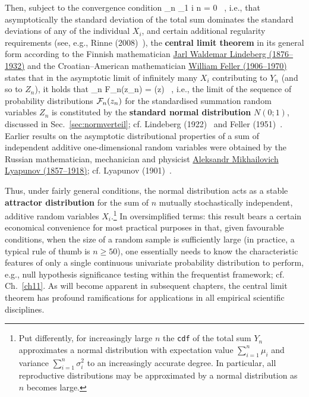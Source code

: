 \medskip
\noindent
Then, subject to the convergence condition
%
\be
\lim_{n \to \infty}\max_{1 \leq i \leq 
n} = 0 \ ,
\ee
%
i.e., that asymptotically the standard deviation of the total sum 
dominates the standard deviations of any of the individual $X_{i}$,
and certain additional regularity requirements (see, e.g., Rinne
(2008)~), the \textbf{central limit theorem}
in its general form according to the Finnish mathematician 
\href{http://en.wikipedia.org/wiki/Jarl_Waldemar_Lindeberg}{Jarl 
Waldemar Lindeberg (1876--1932)} and the Croatian--American 
mathematician 
\href{http://www-history.mcs.st-and.ac.uk/Biographies/Feller.html}{William Feller (1906--1970)} states that in the asymptotic limit 
of infinitely many $X_{i}$ contributing to $Y_{n}$ (and so to
$Z_{n}$), it holds that
%
\be
\lim_{n \to \infty}{\cal F}_{n}(z_{n}) = \Phi(z) \ ,
\ee
%
i.e., the limit of the sequence of probability distributions ${\cal 
F}_{n}(z_{n})$ for the standardised summation random variables 
$Z_{n}$ is constituted by the \textbf{standard normal distribution} 
$N(0;1)$, discussed in Sec.~\ref{sec:normverteil}; cf. Lindeberg 
(1922)~ and Feller (1951)~. Earlier 
results on the asymptotic distributional properties of a 
sum of independent additive one-dimensional random variables were 
obtained by the Russian mathematician, mechanician and physicist 
\href{http://www-history.mcs.st-and.ac.uk/Biographies/Lyapunov.html}{Aleksandr Mikhailovich Lyapunov (1857--1918)}; cf. Lyapunov 
(1901)~.

\medskip
\noindent
Thus, under fairly general conditions, the normal distribution 
acts as a stable \textbf{attractor distribution} for the sum of $n$ 
mutually stochastically independent, additive random variables 
$X_{i}$.\footnote{Put differently, for 
increasingly large $n$ the \texttt{cdf} of the total sum 
$Y_{n}$ approximates a normal distribution with expectation value 
$\displaystyle\sum_{i=1}^{n}\mu_{i}$ and variance 
$\displaystyle\sum_{i=1}^{n}\sigma_{i}^{2}$ to an increasingly 
accurate degree. In particular, all reproductive distributions 
may be approximated by a normal distribution as $n$ becomes 
large.} In oversimplified terms: this result bears a certain 
economical convenience for most practical purposes in that, given 
favourable conditions, when the size of a random sample is 
sufficiently large (in practice, a typical rule of thumb is $n 
\geq 50$), one essentially needs to know the characteristic 
features of only a single continuous univariate probability 
distribution to perform, e.g., null hypothesis significance testing
within the frequentist framework; cf. Ch.~\ref{ch11}. 
As will become apparent in subsequent chapters, 
the central limit theorem has profound ramifications for 
applications in all empirical scientific disciplines.

